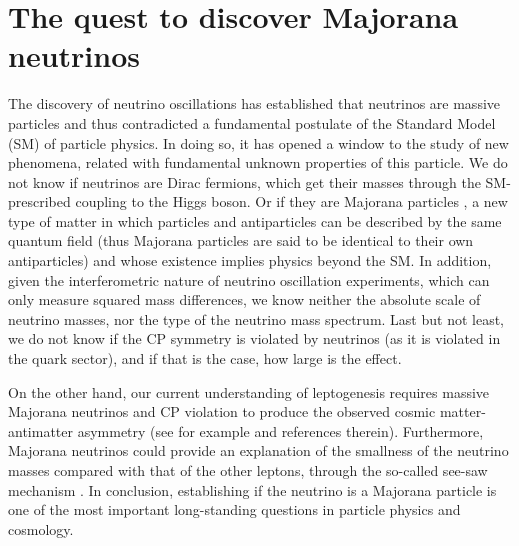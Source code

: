 \section{The quest to discover Majorana neutrinos}

The discovery of neutrino oscillations \cite{Super-Kamiokande:1998kpq,SNO:2001kpb,SNO:2002tuh} has established that neutrinos are massive
particles \cite{GonzalezGarcia:2002dz} and thus contradicted a fundamental postulate of the Standard Model (SM) of particle physics. In doing so, it has opened a window to the study of new phenomena, related with fundamental unknown properties of this particle. We do not know if neutrinos are Dirac fermions, which get their masses through the SM-prescribed coupling to the Higgs boson. Or if they are Majorana particles \cite{Majorana:1937}, a new type of matter in which particles and antiparticles can be described by the same quantum field (thus Majorana particles are said to be identical to their own antiparticles) and whose existence implies physics beyond the SM. In addition, given the interferometric nature of neutrino oscillation experiments, which can only measure squared mass differences, we know neither the absolute scale of neutrino masses, nor the type of the neutrino mass spectrum. Last but not least, we do not know if the CP symmetry is violated by neutrinos (as it is violated in the quark sector), and if that is the case, how large is the effect.

On the other hand, our current understanding of leptogenesis  \cite{Fukugita:1986hr, Fukugita:1998vn} requires
massive Majorana neutrinos and CP violation to produce the observed cosmic matter-antimatter asymmetry (see for example \cite{Sarkar:1998im} and references therein). Furthermore, Majorana neutrinos could provide an explanation of the smallness of the neutrino masses compared with that of the other leptons, through the so-called see-saw mechanism
\cite{GellMann:1980vs, Yanagida:1979as, Mohapatra:1979ia}. In conclusion, establishing if the neutrino is a Majorana particle is one of the most important long-standing questions in particle physics and cosmology.

